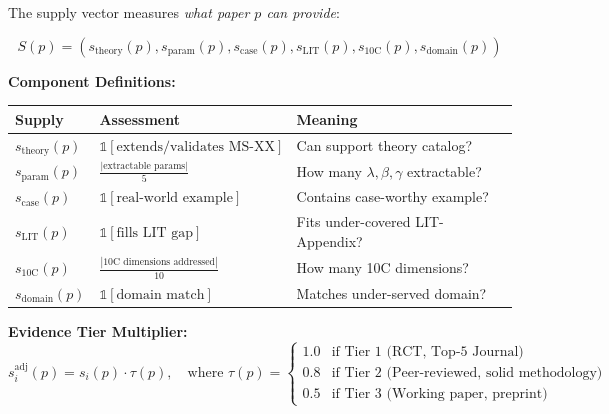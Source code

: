 \begin{tcolorbox}[colback=blue!5!white, colframe=blue!75!black,
    title=\textbf{Definition 7: Supply Vector $S(p) = (s_1(p), \ldots, s_6(p))$ (Paper Provides)}]

The supply vector measures \textit{what paper $p$ can provide}:

\begin{equation}
S(p) = (s_{\text{theory}}(p), s_{\text{param}}(p), s_{\text{case}}(p), s_{\text{LIT}}(p), s_{\text{10C}}(p), s_{\text{domain}}(p))
\end{equation}

\textbf{Component Definitions:}

\begin{tabular}{@{}llp{6cm}@{}}
\toprule
\textbf{Supply} & \textbf{Assessment} & \textbf{Meaning} \\
\midrule
$s_{\text{theory}}(p)$ & $\mathbb{1}[\text{extends/validates MS-XX}]$ & Can support theory catalog? \\
$s_{\text{param}}(p)$ & $\frac{|\text{extractable params}|}{5}$ & How many $\lambda, \beta, \gamma$ extractable? \\
$s_{\text{case}}(p)$ & $\mathbb{1}[\text{real-world example}]$ & Contains case-worthy example? \\
$s_{\text{LIT}}(p)$ & $\mathbb{1}[\text{fills LIT gap}]$ & Fits under-covered LIT-Appendix? \\
$s_{\text{10C}}(p)$ & $\frac{|\text{10C dimensions addressed}|}{10}$ & How many 10C dimensions? \\
$s_{\text{domain}}(p)$ & $\mathbb{1}[\text{domain match}]$ & Matches under-served domain? \\
\bottomrule
\end{tabular}

\textbf{Evidence Tier Multiplier:}
\begin{equation}
s_i^{\text{adj}}(p) = s_i(p) \cdot \tau(p), \quad \text{where } \tau(p) =
\begin{cases}
1.0 & \text{if Tier 1 (RCT, Top-5 Journal)} \\
0.8 & \text{if Tier 2 (Peer-reviewed, solid methodology)} \\
0.5 & \text{if Tier 3 (Working paper, preprint)}
\end{cases}
\end{equation}

\end{tcolorbox}


